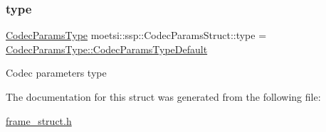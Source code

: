 \subsubsection{\texorpdfstring{type}{type}}
{\footnotesize\ttfamily \hyperlink{namespacemoetsi_1_1ssp_a6d638ba0bd38e9daded08f633d893563}{Codec\+Params\+Type} moetsi\+::ssp\+::\+Codec\+Params\+Struct\+::type = \hyperlink{namespacemoetsi_1_1ssp_a6d638ba0bd38e9daded08f633d893563a1ffd3a6c06641b95d3e5142403ed0730}{Codec\+Params\+Type\+::\+Codec\+Params\+Type\+Default}}

Codec parameters type 

The documentation for this struct was generated from the following file\+:\begin{DoxyCompactItemize}
\item 
\hyperlink{frame__struct_8h}{frame\+\_\+struct.\+h}\end{DoxyCompactItemize}
